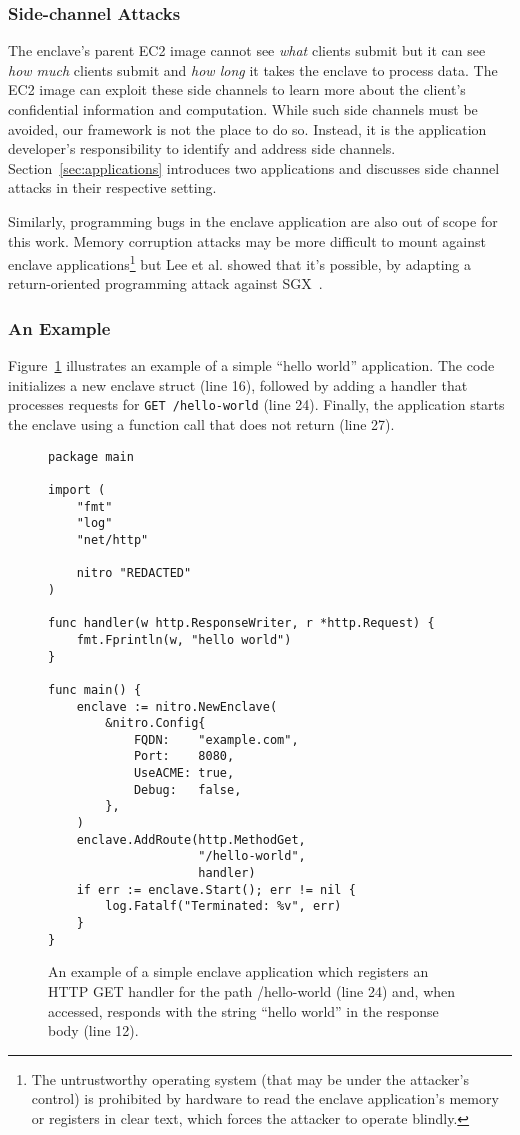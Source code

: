 \subsubsection{Side-channel Attacks}
\label{sec:side-channels}

The enclave's parent EC2 image cannot see \emph{what} clients submit but it can
see \emph{how much} clients submit and \emph{how long} it takes the enclave to
process data.  The EC2 image can exploit these side channels to learn more
about the client's confidential information and computation.  While such side
channels must be avoided, our framework is not the place to do so.  Instead, it
is the application developer's responsibility to identify and address side
channels.  Section~\ref{sec:applications} introduces two applications and
discusses side channel attacks in their respective setting.

Similarly, programming bugs in the enclave application are also out of scope for
this work.  Memory corruption attacks may be more difficult to mount against
enclave applications\footnote{The untrustworthy operating system (that may be
under the attacker's control) is prohibited by hardware to read the enclave
application's memory or registers in clear text, which forces the attacker to
operate blindly.} but Lee et al. showed that it's possible, by adapting a
return-oriented programming attack against SGX~\cite{Lee2017a}.

\subsubsection{An Example}

Figure~\ref{fig:hello-world} illustrates an example of a simple ``hello world''
application.  The code initializes a new enclave struct (line 16), followed by
adding a handler that processes requests for \texttt{GET /hello-world} (line
24).  Finally, the application starts the enclave using a function call that
does not return (line 27).

\begin{figure}[t]
\begin{lstlisting}
package main

import (
    "fmt"
    "log"
    "net/http"

    nitro "REDACTED"
)

func handler(w http.ResponseWriter, r *http.Request) {
    fmt.Fprintln(w, "hello world")
}

func main() {
    enclave := nitro.NewEnclave(
        &nitro.Config{
            FQDN:    "example.com",
            Port:    8080,
            UseACME: true,
            Debug:   false,
        },
    )
    enclave.AddRoute(http.MethodGet,
                     "/hello-world",
                     handler)
    if err := enclave.Start(); err != nil {
        log.Fatalf("Terminated: %v", err)
    }
}
\end{lstlisting}
\caption{An example of a simple enclave application which registers an HTTP GET
  handler for the path /hello-world (line 24) and, when accessed, responds with
  the string ``hello world'' in the response body (line 12).}
\label{fig:hello-world}
\end{figure}
